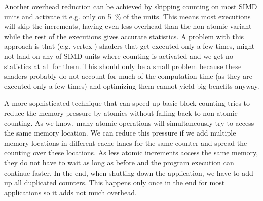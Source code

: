 Another overhead reduction can be achieved by skipping counting on most SIMD units and activate it e.g. only on \SI{5}{\percent} of the units.
This means most executions will skip the increments, having even less overhead than the non-atomic variant while the rest of the executions gives accurate statistics.
A problem with this approach is that (e.g. vertex-) shaders that get executed only a few times, might not land on any of SIMD units where counting is activated and we get no statistics at all for them.
This should only be a small problem because these shaders probably do not account for much of the computation time (as they are executed only a few times) and optimizing them cannot yield big benefits anyway.

A more sophisticated technique that can speed up basic block counting tries to reduce the memory pressure by atomics without falling back to non-atomic counting. As we know, many atomic operations will simultaneously try to access the same memory location.
We can reduce this pressure if we add multiple memory locations in different cache lanes for the same counter and spread the counting over these locations. As less atomic increments access the same memory, they do not have to wait as long as before and the program execution can continue faster.
In the end, when shutting down the application, we have to add up all duplicated counters. This happens only once in the end for most applications so it adds not much overhead.
